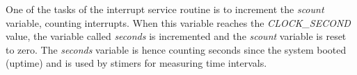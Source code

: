 One of the tasks of the interrupt service routine is to increment the {\it{scount}} variable,
counting interrupts.
When this variable reaches the {\it{CLOCK\_SECOND}} value, the variable called
{\it{seconds}} is incremented and the {\it{scount}} variable is reset to zero.
The {\it{seconds}} variable is hence counting seconds since the system booted (uptime)
and is used by stimers for measuring time intervals.
